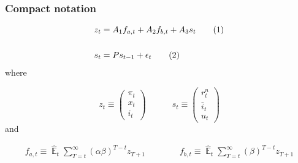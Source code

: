\documentclass{beamer}
\DeclareMathOperator{\E}{\mathbb{E}}
\newcommand\numberthis{\addtocounter{equation}{1}\tag{\theequation}} %
\newcommand{\backupend}{
   \addtocounter{framenumberappendix}{-\value{framenumber}}
   \addtocounter{framenumber}{\value{framenumberappendix}} 
}
\begin{document}
\begin{frame}
	\frametitle{Compact notation}
	\label{compact}

 \begin{align*}
z_t & = A_1 f_{a,t} + A_2 f_{b,t} + A_3 s_t \label{LOM_LR} \numberthis \\
\\
s_t & = P s_{t-1} + \epsilon_t \label{exog} \numberthis
\end{align*}
where

\begin{equation}
 z_t \equiv \begin{pmatrix} \pi_t \\ x_t \\ i_t
 \end{pmatrix} 
 \quad \quad \quad 
  s_t  \equiv \begin{pmatrix} r_t^n \\ \bar{i}_t \\ u_t 
 \end{pmatrix} 
\end{equation}
and

  \begin{align}
f_{a,t}  \equiv  \hat{\E}_t\sum_{T=t}^{\infty} (\alpha\beta)^{T-t } z_{T+1} \quad \quad \quad \quad f_{b,t}  \equiv \hat{\E}_t\sum_{T=t}^{\infty} (\beta)^{T-t } z_{T+1} \label{fafb}
\end{align}

\hyperlink{NK}{}	


\end{frame}
%
%
%

\backupend
\end{document}
